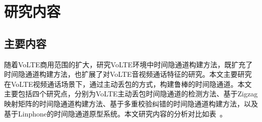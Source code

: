 \section{研究内容}
\label{sec:intro:work}

\subsection{主要内容}
\label{sec:intro:work:mainwork}

随着VoLTE商用范围的扩大，研究VoLTE环境中时间隐通道构建方法，既扩充了时间隐通道构建方法，也扩展了对VoLTE音视频通话特征的研究。本文主要研究在VoLTE视频通话场景下，通过主动丢包的方式，构建鲁棒的时间隐通道。本文主要包括四个研究点，分别为VoLTE主动丢包时间隐通道的检测方法、基于Zigzag映射矩阵的时间隐通道构建方法、基于多重校验纠错的时间隐通道构建方法，以及基于Linphone的时间隐通道原型系统。本文研究内容的分析对比如表\ 。


